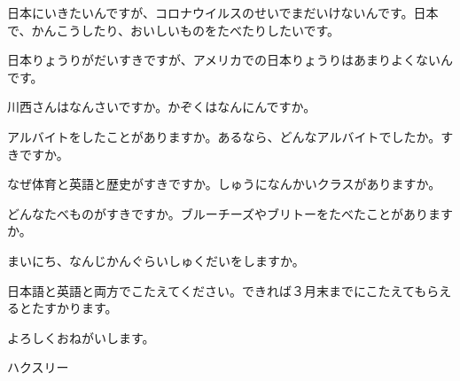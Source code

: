 \documentclass[letterpaper]{article}
\begin{document}
日本にいきたいんですが、コロナウイルスのせいでまだいけないんです。日本で、かんこうしたり、おいしいものをたべたりしたいです。

日本りょうりがだいすきですが、アメリカでの日本りょうりはあまりよくないんです。

川西さんはなんさいですか。かぞくはなんにんですか。

アルバイトをしたことがありますか。あるなら、どんなアルバイトでしたか。すきですか。

なぜ体育と英語と歴史がすきですか。しゅうになんかいクラスがありますか。

どんなたべものがすきですか。ブルーチーズやブリトーをたべたことがありますか。

まいにち、なんじかんぐらいしゅくだいをしますか。

日本語と英語と両方でこたえてください。できれば３月末までにこたえてもらえるとたすかります。

よろしくおねがいします。

ハクスリー
\end{document}
